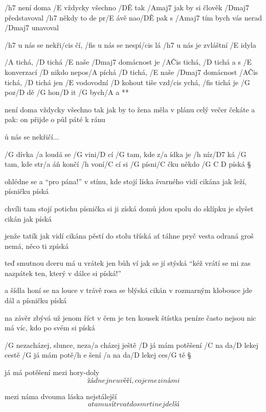
/h7 není doma /E vždycky všechno /D\^E tak
/Amaj7 jak by si člověk /Dmaj7 představoval
/h7 někdy to de pr/E ávě nao/D\^E pak
s /Amaj7 tím bych vás nerad /Dmaj7 unavoval

\R  /h7 u nás se nekři/cis čí, /fis u nás se nespí/cis lá
    /h7 u nás je zvláštní /E idyla

    /A tichá, /D tichá /E naše /Dmaj7 domácnost je /A\^{Cis} tichá, /D tichá
    a s /E konverzací /D nikdo nepos/A píchá
    /D tichá, /E naše /Dmaj7 domácnost /A\^{Cis} tichá, /D tichá
    jen /E vodovodní /D kohout tiše vzd/cis ychá, /fis tichá
    je /G poz/D dě /G hon/D it /G bych/A a **

není doma vždycky všechno tak
jak by to žena měla v plánu
celý večer čekáte a pak:
on přijde o půl páté k ránu

\r u nás se nekřičí...




/G dívka /a loudá se /G vini/D cí
/G tam, kde z/a ídka je /h níz/D7 ká
/G tam, kde str/a áň končí /h voní/C cí
si /G písni/C čku někdo /{G C D} píská \S

ohlédne se a ``pro pána!''
v stínu, kde stojí líska
švarného vidí cikána
jak leží, písničku píská \s

chvíli tam stojí potichu
písnička si ji získá
domů jdou spolu do sklípku
je slyšet cikán jak píská \s

jenže tatík jak vidí cikána
pěstí do stolu tříská
ať táhne pryč vesta odraná
groš nemá, něco ti zpíská \s

teď smutnou dceru má u vrátek
jen bůh ví jak se jí stýská
``kéž vrátí se mi zas nazpátek
ten, který v dálce si píská!''\s

a šídla honí se na louce
v trávě rosa se blýská
cikán v rozmarným klobouce
jde dál a písničku píská \s

na závěr zbývá už jenom říct
v čem je ten kousek štístka
peníze často nejsou nic
má víc, kdo po svém si píská




/G nezacházej, slunce, neza/a cházej ještě
/D já mám potěšení /C na da/D lekej cestě
/G já mám potě/{h e} šení    /a na da/D lekej ces/G tě \S

já má potěšení mezi hory-doly
\[ žádnej neuvěří, co je mezi námi \] \s

mezi náma dvouma láska nejstálejší
\[ a ta musí trvat do smrti nejdelší \] \s

